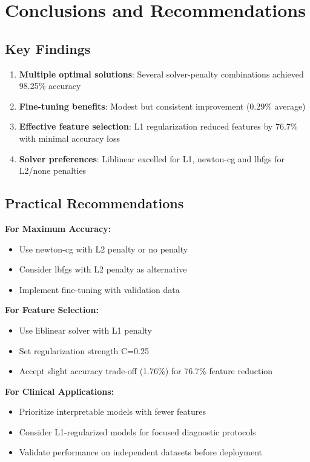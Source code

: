 \documentclass[12pt,a4paper]{article}
\begin{document}
\section{Conclusions and Recommendations}

\subsection{Key Findings}

\begin{enumerate}
    \item \textbf{Multiple optimal solutions}: Several solver-penalty combinations achieved 98.25\% accuracy
    \item \textbf{Fine-tuning benefits}: Modest but consistent improvement (0.29\% average)
    \item \textbf{Effective feature selection}: L1 regularization reduced features by 76.7\% with minimal accuracy loss
    \item \textbf{Solver preferences}: Liblinear excelled for L1, newton-cg and lbfgs for L2/none penalties
\end{enumerate}

\subsection{Practical Recommendations}

\textbf{For Maximum Accuracy:}
\begin{itemize}
    \item Use newton-cg with L2 penalty or no penalty
    \item Consider lbfgs with L2 penalty as alternative
    \item Implement fine-tuning with validation data
\end{itemize}

\textbf{For Feature Selection:}
\begin{itemize}
    \item Use liblinear solver with L1 penalty
    \item Set regularization strength C=0.25
    \item Accept slight accuracy trade-off (1.76\%) for 76.7\% feature reduction
\end{itemize}

\textbf{For Clinical Applications:}
\begin{itemize}
    \item Prioritize interpretable models with fewer features
    \item Consider L1-regularized models for focused diagnostic protocols
    \item Validate performance on independent datasets before deployment
\end{itemize}
\end{document}
